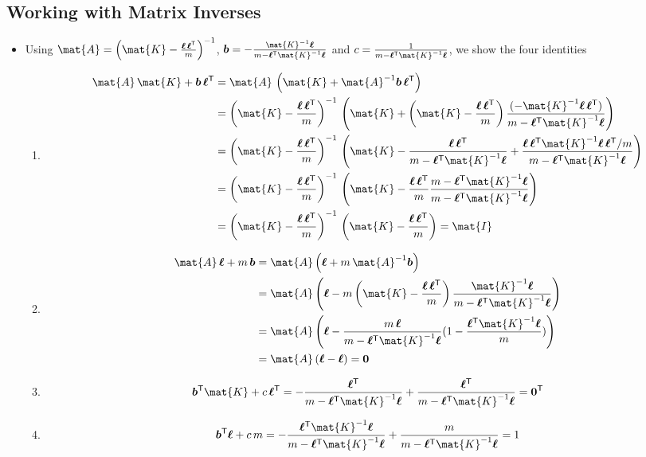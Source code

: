 \documentclass[11pt]{article}
\newcommand{\tr}{\textsf{T}}
\newcommand{\vl}{\bm{\ell}}
\newcommand{\vb}{\bm{b}}
\begin{document}
\subsection{Working with Matrix Inverses}
\label{sec:org964a18e}
\begin{itemize}
\item Using \(\mat{A} = 
         \left(\mat{K}-\frac{\vl\,\vl^\tr}{m}\right)^{-1}\),
\(\vb=-\frac{\mat{K}^{-1} \vl}{m-\vl^\tr \mat{K}^{-1}\vl}\)
and \(c=\frac{1}{m-\vl^\tr \mat{K}^{-1}\vl}\), we show the four identities
\begin{enumerate}
\item \begin{align*}
\mat{A}\,\mat{K} + \vb\,\vl^\tr
&= \mat{A}\,\left(\mat{K} + \mat{A}^{-1} \vb\,\vl^\tr\right) \\
&=\left(\mat{K}-\frac{\vl\,\vl^\tr}{m}\right)^{-1} \,\left(\mat{K} +
\left(\mat{K}-\frac{\vl\,\vl^\tr}{m}\right)
 \frac{(-\mat{K}^{-1} \vl\,\vl^\tr)}{m-\vl^\tr \mat{K}^{-1}\vl} \right) \\
 &= \left(\mat{K}-\frac{\vl\,\vl^\tr}{m}\right)^{-1} \,\left(\mat{K} 
- \frac{\vl\,\vl^\tr}{m-\vl^\tr \mat{K}^{-1}\vl}
+ \frac{\vl\,\vl^\tr\mat{K}^{-1}\vl\,\vl^\tr/m}{m-\vl^\tr \mat{K}^{-1}\vl} \right)\\
&= \left(\mat{K}-\frac{\vl\,\vl^\tr}{m}\right)^{-1} \,\left(\mat{K} 
- \frac{\vl\,\vl^\tr}{m} 
  \frac{m-\vl^\tr \mat{K}^{-1}\vl}{m-\vl^\tr \mat{K}^{-1}\vl}\right) \\
&= \left(\mat{K}-\frac{\vl\,\vl^\tr}{m}\right)^{-1} \,\left(\mat{K} 
- \frac{\vl\,\vl^\tr}{m} \right) = \mat{I}
\end{align*}
\item \begin{align*}
\mat{A}\,\vl + m\,\vb 
&=  \mat{A} \left( \vl + m \,\mat{A}^{-1}\vb\right) \\
&= \mat{A} \left( \vl - m
\left(\mat{K}-\frac{\vl\,\vl^\tr}{m}\right)
 \frac{\mat{K}^{-1} \vl}{m-\vl^\tr \mat{K}^{-1}\vl} \right) \\
&=\mat{A} \left( \vl 
- \frac{m\,\vl}{m-\vl^\tr \mat{K}^{-1}\vl} (1 -\frac{\vl^\tr \mat{K}^{-1}\vl}{m}) \right)\\
&= \mat{A} \left( \vl -\vl \right) = \bm{0}
\end{align*}
\item $$ \vb^\tr\mat{K} + c\,\vl^\tr = -\frac{\vl^\tr}{m-\vl^\tr
          \mat{K}^{-1}\vl} + \frac{\vl^\tr}{m-\vl^\tr
          \mat{K}^{-1}\vl}= \bm{0}^\tr $$
\item $$ \vb^\tr \vl + c\,m =  -\frac{\vl^\tr \mat{K}^{-1} \vl}{m-\vl^\tr \mat{K}^{-1}\vl} + \frac{m}{m-\vl^\tr \mat{K}^{-1}\vl} = 1 $$
\end{enumerate}
\end{itemize}
\end{document}
